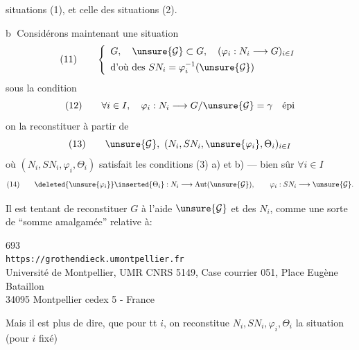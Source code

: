
situations (1), et celle des situations (2).

\textcircled{b}
Considérons maintenant une situation
\[
(11)\qquad 
\left\{\begin{array}{l}
G,\quad \unsure{\mathcal G}\subset G,\quad (\varphi_i:N_i\longrightarrow G)_{i\in I}\\[4pt]
\text{d'où des }SN_i=\varphi_i^{-1}(\unsure{\mathcal G})
\end{array}\right.
\]
sous la condition
\[
(12)\qquad 
\forall i\in I,\quad \varphi_i:N_i\longrightarrow G/\unsure{\mathcal G}=\gamma\quad\text{épi}
\]
 on la reconstituer à partir de
\[
(13)\qquad 
\unsure{\mathcal G},\ (N_i,SN_i,\unsure{\varphi_i},\Theta_i)_{i\in I}
\]
où  $(N_i,SN_i,\varphi_i,\Theta_i)$ satisfait les conditions (3) a) et b) ---  bien sûr $\forall i\in I$
\[
(14)\qquad 
\deleted{\unsure{\varphi_i}}\inserted{\Theta_i}:N_i\longrightarrow\operatorname{Aut}(\unsure{\mathcal G}),\qquad
\varphi_i:SN_i\longrightarrow\unsure{\mathcal G}.
\]

Il est tentant de reconstituer $G$ à l'aide  $\unsure{\mathcal G}$ et des $N_i$, comme une sorte de ``somme amalgamée'' relative à:

\noindent {}\quad
{}


\begin{center}
693\\
\texttt{https://grothendieck.umontpellier.fr}\\
Université de Montpellier, UMR CNRS 5149, Case courrier 051, Place Eugène Bataillon\\
34095 Montpellier cedex 5 - France
\end{center}




Mais il est plus  de dire, que pour tt $i$, on reconstitue  $N_i,SN_i,\varphi_i,\Theta_i$ la situation (pour $i$ fixé)

